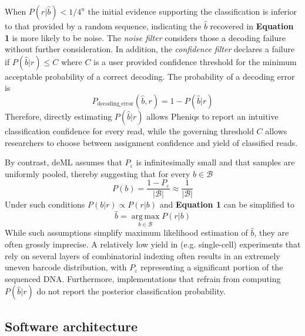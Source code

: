 \documentclass[twocolumn]{bmcart}
\begin{document}
When $P(r|\hat{b}) < 1/4^n$ the initial evidence supporting the classification is inferior to that provided by a random sequence, indicating the $\hat{b}$ recovered in \textbf{Equation 1} is more likely to be noise. The \emph{noise filter} considers those a decoding failure without further consideration.
%
In addition, the \emph{confidence filter} declares a failure if $P(\hat{b}|r) \leq C$ where $C$ is a user provided confidence threshold for the minimum acceptable probability of a correct decoding. The probability of a decoding error is
%
\begin{equation}
P_{\text{decoding\_error}}(\hat{b}, r) = 1 - P(\hat{b}|r)
\end{equation}
%
 Therefore, directly estimating $P(\hat{b}|r)$ allows Pheniqs to report an intuitive classification confidence for every read, while the governing threshold $C$ allows researchers to choose between assignment confidence and yield of classified reads.

By contrast, deML \cite{doi:10.1093/bioinformatics/btu719} assumes that $P_{\varepsilon}$ is infinitesimally small and that samples are uniformly pooled, thereby suggesting that for every $b \in \mathcal{B}$
%
\begin{equation}
P(b) = \frac{1 - P_{\varepsilon}}{|\mathcal{B}|} %
\approx \frac{1}{|\mathcal{B}|}
\end{equation}
%
Under such conditions $P(b|r) \propto P(r|b)$ and \textbf{Equation 1} can be simplified to
%
\begin{equation}
\hat{b} = \operatorname*{arg\,max}_{b \in \mathcal{B}} P(r|b)
\end{equation}
%
While such assumptions simplify maximum likelihood estimation of $\hat{b}$, they are often grossly imprecise. A relatively low yield in (e.g. single-cell) experiments that rely on several layers of combinatorial indexing often results in an extremely uneven barcode distribution, with $P_{\varepsilon}$ representing a significant portion of the sequenced DNA. Furthermore, implementations that refrain from computing $P(\hat{b}|r)$ do not report the posterior classification probability.

\subsection*{Software architecture}
\end{document}
